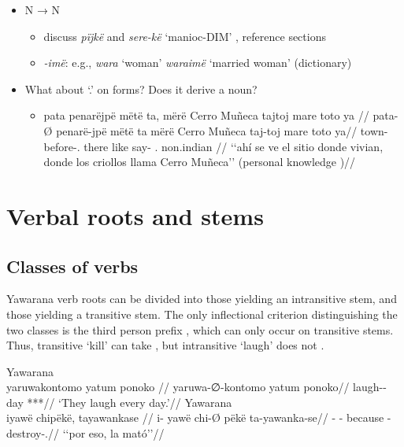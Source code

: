 \documentclass{memoir}
\begin{document}
\begin{itemize}
  \begin{itemize}
  \tightlist
  \item
     `'
  \end{itemize}
\item
  N → N

  \begin{itemize}
  \tightlist
  \item
    discuss \emph{pïjkë} and \emph{sere-kë} `manioc-DIM' , reference
    sections
  \item
    \emph{-imë}: e.g., \emph{wara} `woman' \emph{waraimë} `married
    woman' (dictionary)
  \end{itemize}
\item
  What about  `.' on  forms? Does
  it derive a noun?

  \begin{itemize}
  \item
    \ex \label{histyarirdi-592}
    \begingl \glpreamble pata penarëjpë mëtë ta, mërë Cerro Muñeca tajtoj mare toto ya //
    \gla pata-Ø penarë-jpë mëtë ta mërë Cerro Muñeca taj-toj mare toto ya//
    \glb town- before-. there like   say- . non.indian //
    \glft ‘‘ahí se ve el sitio donde vivian, donde los criollos llama Cerro Muñeca’’ (personal knowledge
    )//
    \endgl
    \xe
  \end{itemize}
\end{itemize}

\chapter{\texorpdfstring{Verbal roots and stems
\label{verbderiv}}{Verbal roots and stems }}

\section{Classes of verbs}

Yawarana verb roots can be divided into those yielding an intransitive
stem, and those yielding a transitive stem. The only inflectional
criterion distinguishing the two classes is the third person prefix
, which can only occur on transitive stems. Thus, transitive
 `kill' can take  , but
intransitive  `laugh' does not .

\pex\label{}    \a Yawarana\\
    \label{convrisamaj-42}        \begingl
        \glpreamble yaruwakontomo yatum ponoko //
        \gla yaruwa-∅-kontomo yatum ponoko//
        \glb laugh-- day ***//
            \glft ‘They laugh every day.’//  
        \endgl 
    \a Yawarana\\
    \label{convfemgrme-217}        \begingl
        \glpreamble iyawë chipëkë, tayawankase //
        \gla i- yawë chi-Ø pëkë ta-yawanka-se//
        \glb {}-  - because -destroy-.//
            \glft ‘‘por eso, la mató’’//  
        \endgl 
\xe
\end{document}

